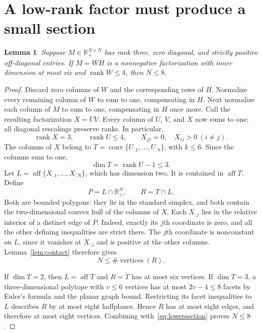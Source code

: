 \documentclass[11pt]{article}
\newtheorem{lemma}[theorem]{Lemma}
\newcommand{\rank}{\operatorname{rank}}
\newcommand{\conv}{\operatorname{conv}}
\newcommand{\aff}{\operatorname{aff}}
\newcommand{\R}{\mathbb R}
\begin{document}
\section{A low-rank factor must produce a small section}
\begin{lemma}\label{lem:factor}
Suppose $M\in\R_+^{N\times N}$ has rank three, zero diagonal, and strictly positive off-diagonal entries. If $M=WH$ is a nonnegative factorization with inner dimension at most six and $\rank W\leq4$, then $N\leq8$.
\end{lemma}
\begin{proof}
Discard zero columns of $W$ and the corresponding rows of $H$. Normalize every remaining column of $W$ to sum to one, compensating in $H$. Next normalize each column of $M$ to sum to one, compensating in $H$ once more. Call the resulting factorization $X=UV$. Every column of $U$, $V$, and $X$ now sums to one; all diagonal rescalings preserve ranks. In particular,
\[
 \rank X=3,\qquad \rank U\leq4,
 \qquad X_{jj}=0,\quad X_{ij}>0\ (i\ne j).
\]
The columns of $X$ belong to $T=\conv\{U_{:1},\ldots,U_{:k}\}$, with $k\leq6$. Since the columns sum to one,
\[
 \dim T=\rank U-1\leq3.
\]
Let $L=\aff\{X_{:1},\ldots,X_{:N}\}$, which has dimension two. It is contained in $\aff T$. Define
\[
 P=L\cap\R_+^N,\qquad R=T\cap L.
\]
Both are bounded polygons: they lie in the standard simplex, and both contain the two-dimensional convex hull of the columns of $X$. Each $X_{:j}$ lies in the relative interior of a distinct edge of $P$. Indeed, exactly its $j$th coordinate is zero, and all the other defining inequalities are strict there. The $j$th coordinate is nonconstant on $L$, since it vanishes at $X_{:j}$ and is positive at the other columns. Lemma~\ref{lem:contact} therefore gives
\begin{equation}\label{eq:lowersection}
 N\leq\#\operatorname{vertices}(R).
\end{equation}

If $\dim T=2$, then $L=\aff T$ and $R=T$ has at most six vertices. If $\dim T=3$, a three-dimensional polytope with $v\leq6$ vertices has at most $2v-4\leq8$ facets by Euler's formula and the planar graph bound. Restricting its facet inequalities to $L$ describes $R$ by at most eight halfplanes. Hence $R$ has at most eight edges, and therefore at most eight vertices. Combining with~\eqref{eq:lowersection} proves $N\leq8$.
\end{proof}
\end{document}
